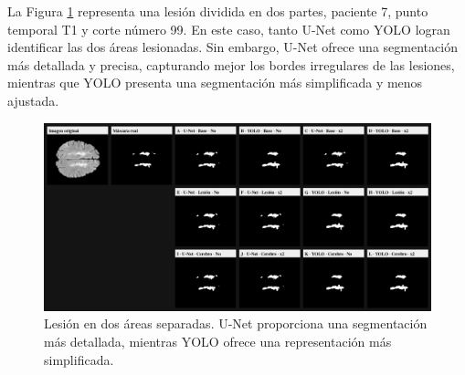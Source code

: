 \documentclass[../main.tex]{subfiles}
\begin{document}
La Figura \ref{fig:P7_T1_Z99_matriz_12exps} representa una lesión dividida en dos partes, paciente 7, punto temporal T1 y corte número 99. En este caso, tanto U-Net como YOLO logran identificar las dos áreas lesionadas. Sin embargo, U-Net ofrece una segmentación más detallada y precisa, capturando mejor los bordes irregulares de las lesiones, mientras que YOLO presenta una segmentación más simplificada y menos ajustada.

\begin{figure}[H]
    \centering
    \includegraphics[width=1\linewidth]{imgs/resultados/comp/P7_T1_Z99_matriz_12exps.png}
    \caption{Lesión en dos áreas separadas. U-Net proporciona una segmentación más detallada, mientras YOLO ofrece una representación más simplificada.}
    \label{fig:P7_T1_Z99_matriz_12exps}
\end{figure}
\end{document}
